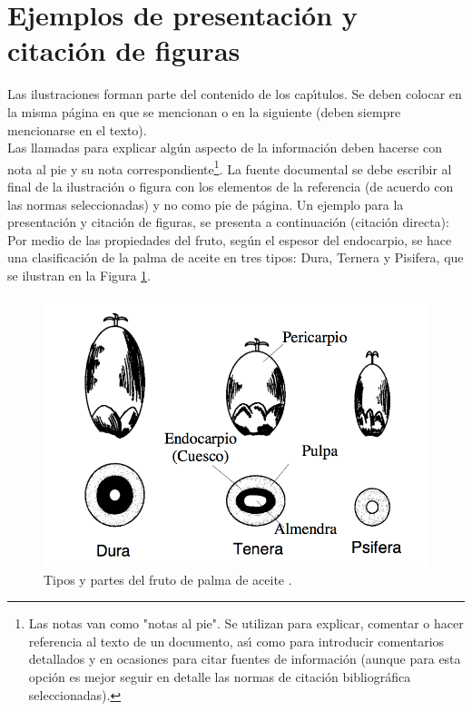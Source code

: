 \section{Ejemplos de presentaci\'{o}n y citaci\'{o}n de figuras}
Las ilustraciones forman parte del contenido de los cap\'{\i}tulos. Se deben colocar en la misma p\'{a}gina en que se mencionan o en la siguiente (deben siempre mencionarse en el texto).\\

Las llamadas para explicar alg\'{u}n aspecto de la informaci\'{o}n deben hacerse con nota al pie y su nota correspondiente\footnote{Las notas van como "notas al pie". Se utilizan para explicar, comentar o hacer referencia al texto de un documento, as\'{\i} como para introducir comentarios detallados y en ocasiones para citar fuentes de informaci\'{o}n (aunque para esta opci\'{o}n es mejor seguir en detalle las normas de citaci\'{o}n bibliogr\'{a}fica seleccionadas).}. La fuente documental se debe escribir al final de la ilustraci\'{o}n o figura con los elementos de la referencia (de acuerdo con las normas seleccionadas) y no como pie de p\'{a}gina. Un ejemplo para la presentaci\'{o}n y citaci\'{o}n de figuras, se presenta a continuaci\'{o}n (citaci\'{o}n directa):\\

Por medio de las propiedades del fruto, seg\'{u}n el espesor del endocarpio, se hace una clasificaci\'{o}n de la palma de aceite en tres tipos: Dura, Ternera y Pisifera, que se ilustran en la Figura
\ref{fig:Fruto}.\\
\begin{figure}[h]
\centering%
\includegraphics{Kap3/FrutoSp}%
\caption{Tipos y partes del fruto de palma de aceite \cite{AG03p,AG04p}.} \label{fig:Fruto}
\end{figure}

